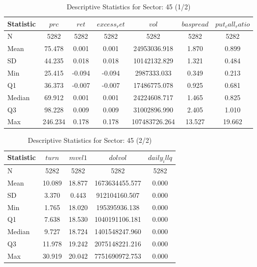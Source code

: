     \begin{table}[H]
    \centering

    
    \caption{Descriptive Statistics for Sector: 45 (1/2)}
    \label{tab:sec45_a}
    
    \begin{tabular}{lcccccc}
    \toprule
    Statistic & $prc$ & $ret$ & $excess_ret$ & $vol$ & $baspread$ & $put_call_ratio$ \\\midrule
    N & 5282 & 5282 & 5282 & 5282 & 5282 & 5282 \\
    Mean & 75.478 & 0.001 & 0.001 & 24953036.918 & 1.870 & 0.899 \\
    SD & 44.235 & 0.018 & 0.018 & 10142132.829 & 1.321 & 0.484 \\
    Min & 25.415 & -0.094 & -0.094 & 2987333.033 & 0.349 & 0.213 \\
    Q1 & 36.373 & -0.007 & -0.007 & 17486775.078 & 0.925 & 0.681 \\
    Median & 69.912 & 0.001 & 0.001 & 24224608.717 & 1.465 & 0.825 \\
    Q3 & 98.228 & 0.009 & 0.009 & 31002896.990 & 2.405 & 1.010 \\
    Max & 246.234 & 0.178 & 0.178 & 107483726.264 & 13.527 & 19.662 \\
    \bottomrule
    \end{tabular}

    \end{table}
    
    \begin{table}[H]
    \centering

    
    \caption{Descriptive Statistics for Sector: 45 (2/2)}
    \label{tab:sec45_b}
    
    \begin{tabular}{lcccc}
    \toprule
    Statistic & $turn$ & $mvel1$ & $dolvol$ & $daily_illq$ \\\midrule
    N & 5282 & 5282 & 5282 & 5282 \\
    Mean & 10.089 & 18.877 & 1673634455.577 & 0.000 \\
    SD & 3.370 & 0.443 & 912104160.507 & 0.000 \\
    Min & 1.765 & 18.020 & 195395936.138 & 0.000 \\
    Q1 & 7.638 & 18.530 & 1040191106.181 & 0.000 \\
    Median & 9.727 & 18.724 & 1401548247.960 & 0.000 \\
    Q3 & 11.978 & 19.242 & 2075148221.216 & 0.000 \\
    Max & 30.919 & 20.042 & 7751690972.753 & 0.000 \\
    \bottomrule
    \end{tabular}

    \end{table}
    
